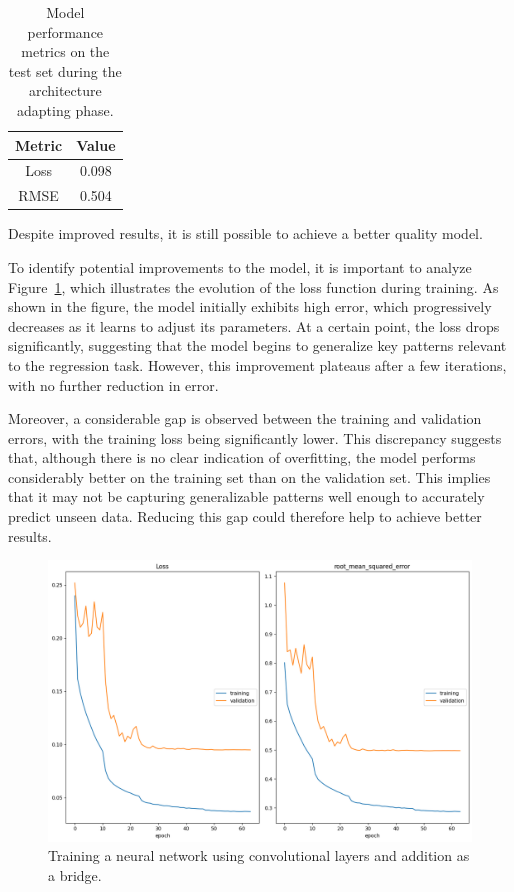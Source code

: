 \begin{table}[H]
    \centering
    \begin{tabular}{|c|c|}
    \hline
    \textbf{Metric} & \textbf{Value} \\
    \hline
    Loss & 0.098 \\
    RMSE & 0.504 \\
    \hline
    \end{tabular}
    \caption{Model performance metrics on the test set during the architecture adapting phase.}
    \label{tab:model_metrics_add_desb}
\end{table}

Despite improved results, it is still possible to achieve a better quality model.

To identify potential improvements to the model, it is important to analyze Figure~\ref{fig:train_addtion_reg}, which illustrates the evolution of the loss function during training. As shown in the figure, the model initially exhibits high error, which progressively decreases as it learns to adjust its parameters. At a certain point, the loss drops significantly, suggesting that the model begins to generalize key patterns relevant to the regression task. However, this improvement plateaus after a few iterations, with no further reduction in error.

Moreover, a considerable gap is observed between the training and validation errors, with the training loss being significantly lower. This discrepancy suggests that, although there is no clear indication of overfitting, the model performs considerably better on the training set than on the validation set. This implies that it may not be capturing generalizable patterns well enough to accurately predict unseen data. Reducing this gap could therefore help to achieve better results.

\begin{figure}[H]
    \centering
    \includegraphics[width=1\textwidth]{figures/neural_net_regression_addition/train_logcosh_addition_desbalanced.png}
    \caption{Training a neural network using convolutional layers and addition as a bridge.}
    \label{fig:train_addtion_reg}
\end{figure}


